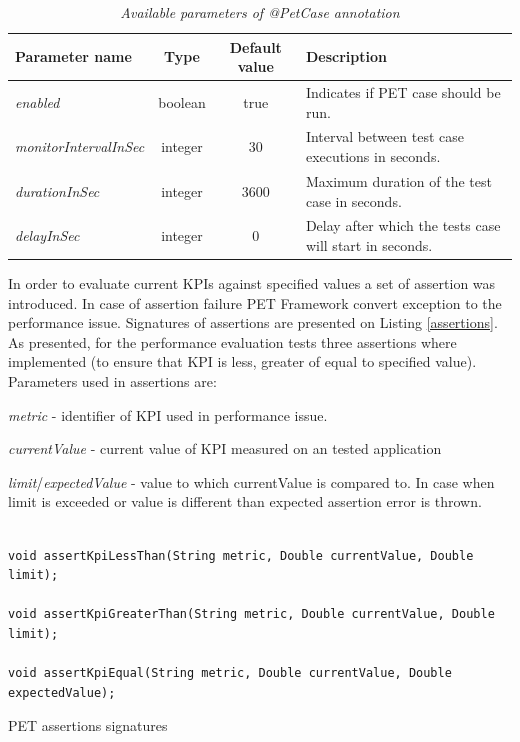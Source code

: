 \documentclass[12pt,a4paper]{article}
\let\tempone\itemize
\let\temptwo\enditemize
\renewenvironment{itemize}{\tempone\addtolength{\itemsep}{-0.4\baselineskip}}{\temptwo}
\begin{document}
\begin{table}[!htb]
\begin{center}
\begin{tabularx}{\textwidth}{l|c|c|X}
  \textbf{Parameter name} &\textbf{Type} & \textbf{Default value} & \textbf{Description} \\
\hline
			\textit{enabled} & boolean & true & Indicates if PET case should be run.\\
			\textit{monitorIntervalInSec} & integer & 30 & Interval between test case executions in seconds.\\
			\textit{durationInSec} & integer & 3600 & Maximum duration of the test case in seconds.\\
			\textit{delayInSec} & integer & 0 & Delay after which the tests case will start in seconds.\\
\end{tabularx}
\end{center}
\caption{\textit{Available parameters of @PetCase annotation}}\label{petcase}
\end{table}			

In order to evaluate current KPIs against specified values a set of assertion was introduced. In case of assertion failure PET Framework convert exception to the performance issue. Signatures of assertions are presented on Listing  \ref{assertions}. As presented, for the performance evaluation tests three assertions where implemented (to ensure that KPI is less, greater of equal to specified value).  Parameters used in assertions are: 
\begin{itemize} 
\item \textit{metric} - identifier of KPI used in performance issue.
\item \textit{currentValue} - current value of KPI measured on an tested application
\item \textit{limit}/\textit{expectedValue} - value to which currentValue is compared to. In case when limit is exceeded or value is different than expected assertion error is thrown.
\end{itemize}

\begin{listing}[ht]\begin{verbatim}

void assertKpiLessThan(String metric, Double currentValue, Double limit);

void assertKpiGreaterThan(String metric, Double currentValue, Double limit);

void assertKpiEqual(String metric, Double currentValue, Double expectedValue);
\end{verbatim}
\caption{PET assertions signatures} \label{assertions}
\end{listing}
\end{document}
